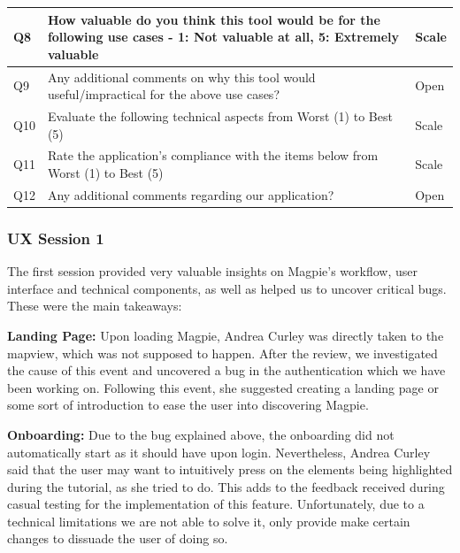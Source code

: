 \begin{table}[h!]
\begin{tabular}{|p{}|p{}|p{}|}
        \hline
        Q8  & How valuable do you think this tool would be for the following use cases - 1: Not valuable at all, 5: Extremely valuable & Scale                  \\
        \hline
        Q9  & Any additional comments on why this tool would useful/impractical for the above use cases?                               & Open                   \\
        \hline
        Q10 & Evaluate the following technical aspects from Worst (1) to Best (5)                                                      & Scale                  \\
        \hline
        Q11 & Rate the application's compliance with the items below from Worst (1) to Best (5)                                        & Scale                  \\
        \hline
        Q12 & Any additional comments regarding our application?                                                                       & Open                   \\
        \hline
    \end{tabular}
\end{table}

\newpage{}

\subsubsection{UX Session 1}
The first session provided very valuable insights on Magpie's workflow, user
interface and technical components, as well as helped us to uncover critical bugs.
These were the main takeaways:

\textbf{Landing Page: }
Upon loading Magpie, Andrea Curley was directly taken to the map\-view, which
was not supposed to happen. After the review, we investigated the cause of this
event and uncovered a bug in the authentication which we have been working on.
Following this event, she suggested creating a landing page or some sort of
introduction to ease the user into discovering Magpie.

\textbf{Onboarding: }
Due to the bug explained above, the onboarding did not automatically start as it
should have upon login. Nevertheless, Andrea Curley said that the user may want
to intuitively press on the elements being highlighted during the tutorial, as
she tried to do. This adds to the feedback received during casual testing for
the implementation of this feature. Unfortunately, due to a technical
limitations we are not able to solve it, only provide make certain changes to
dissuade the user of doing so.

